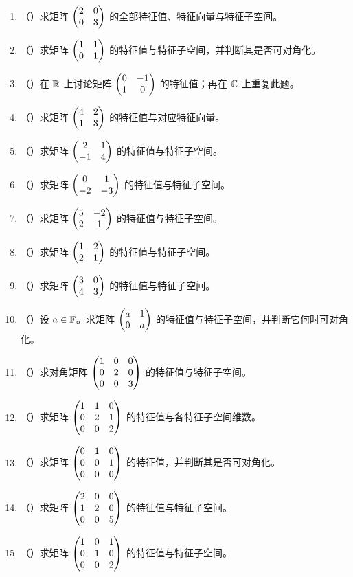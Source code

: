 \begin{enumerate}[label=\arabic*., leftmargin=2.8em]
  \item （\basic）求矩阵 \(\begin{pmatrix} 2&0\\0&3 \end{pmatrix}\) 的全部特征值、特征向量与特征子空间。
  \item （\basic）求矩阵 \(\begin{pmatrix} 1&1\\0&1 \end{pmatrix}\) 的特征值与特征子空间，并判断其是否可对角化。
  \item （\basic）在 \(\mathbb{R}\) 上讨论矩阵 \(\begin{pmatrix} 0&-1\\1&0 \end{pmatrix}\) 的特征值；再在 \(\mathbb{C}\) 上重复此题。
  \item （\basic）求矩阵 \(\begin{pmatrix} 4&2\\1&3 \end{pmatrix}\) 的特征值与对应特征向量。
  \item （\basic）求矩阵 \(\begin{pmatrix} 2&1\\-1&4 \end{pmatrix}\) 的特征值与特征子空间。
  \item （\basic）求矩阵 \(\begin{pmatrix} 0&1\\-2&-3 \end{pmatrix}\) 的特征值与特征子空间。
  \item （\basic）求矩阵 \(\begin{pmatrix} 5&-2\\2&1 \end{pmatrix}\) 的特征值与特征子空间。
  \item （\basic）求矩阵 \(\begin{pmatrix} 1&2\\2&1 \end{pmatrix}\) 的特征值与特征子空间。
  \item （\basic）求矩阵 \(\begin{pmatrix} 3&0\\4&3 \end{pmatrix}\) 的特征值与特征子空间。
  \item （\basic）设 \(a\in \mathbb{F}\)。求矩阵 \(\begin{pmatrix} a&1\\0&a \end{pmatrix}\) 的特征值与特征子空间，并判断它何时可对角化。
  \item （\basic）求对角矩阵 \(\begin{pmatrix} 1&0&0\\0&2&0\\0&0&3 \end{pmatrix}\) 的特征值与特征子空间。
  \item （\basic）求矩阵 \(\begin{pmatrix} 1&1&0\\0&2&1\\0&0&2 \end{pmatrix}\) 的特征值与各特征子空间维数。
  \item （\basic）求矩阵 \(\begin{pmatrix} 0&1&0\\0&0&1\\0&0&0 \end{pmatrix}\) 的特征值，并判断其是否可对角化。
  \item （\basic）求矩阵 \(\begin{pmatrix} 2&0&0\\1&2&0\\0&0&5 \end{pmatrix}\) 的特征值与特征子空间。
  \item （\basic）求矩阵 \(\begin{pmatrix} 1&0&1\\0&1&0\\0&0&2 \end{pmatrix}\) 的特征值与特征子空间。

\end{enumerate}
